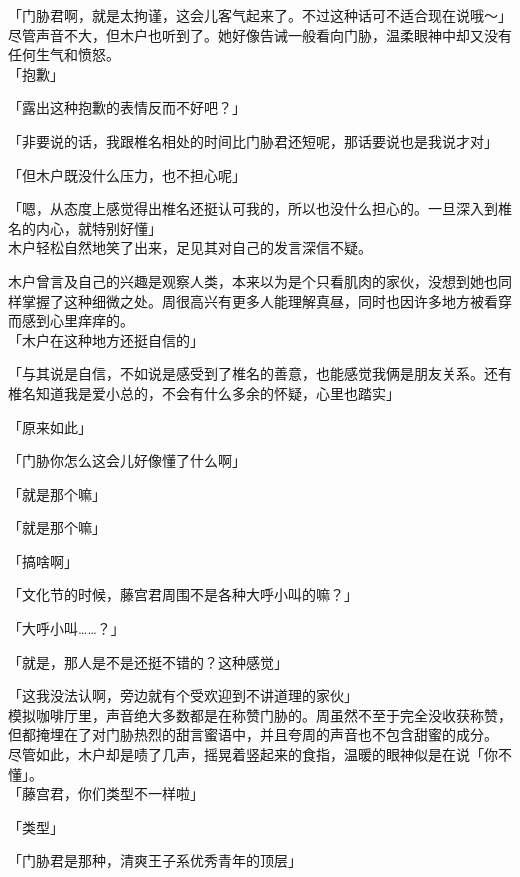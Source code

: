 「门胁君啊，就是太拘谨，这会儿客气起来了。不过这种话可不适合现在说哦～」\\

尽管声音不大，但木户也听到了。她好像告诫一般看向门胁，温柔眼神中却又没有任何生气和愤怒。\\

「抱歉」

「露出这种抱歉的表情反而不好吧？」

「非要说的话，我跟椎名相处的时间比门胁君还短呢，那话要说也是我说才对」

「但木户既没什么压力，也不担心呢」

「嗯，从态度上感觉得出椎名还挺认可我的，所以也没什么担心的。一旦深入到椎名的内心，就特别好懂」\\

木户轻松自然地笑了出来，足见其对自己的发言深信不疑。

木户曾言及自己的兴趣是观察人类，本来以为是个只看肌肉的家伙，没想到她也同样掌握了这种细微之处。周很高兴有更多人能理解真昼，同时也因许多地方被看穿而感到心里痒痒的。\\

「木户在这种地方还挺自信的」

「与其说是自信，不如说是感受到了椎名的善意，也能感觉我俩是朋友关系。还有椎名知道我是爱小总的，不会有什么多余的怀疑，心里也踏实」

「原来如此」

「门胁你怎么这会儿好像懂了什么啊」

「就是那个嘛」

「就是那个嘛」

「搞啥啊」

「文化节的时候，藤宫君周围不是各种大呼小叫的嘛？」

「大呼小叫……？」

「就是，那人是不是还挺不错的？这种感觉」

「这我没法认啊，旁边就有个受欢迎到不讲道理的家伙」\\

模拟咖啡厅里，声音绝大多数都是在称赞门胁的。周虽然不至于完全没收获称赞，但都掩埋在了对门胁热烈的甜言蜜语中，并且夸周的声音也不包含甜蜜的成分。\\

尽管如此，木户却是啧了几声，摇晃着竖起来的食指，温暖的眼神似是在说「你不懂」。\\

「藤宫君，你们类型不一样啦」

「类型」

「门胁君是那种，清爽王子系优秀青年的顶层」

